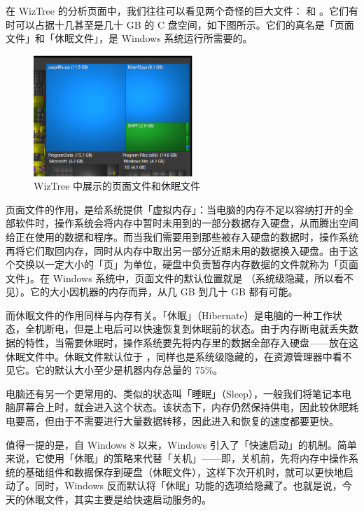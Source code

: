 {在 WizTree 的分析页面中，我们往往可以看见两个奇怪的巨大文件： 和 。它们有时可以占据十几甚至是几十 GB 的 C 盘空间，如下图所示。它们的真名是「页面文件」和「休眠文件」，是 Windows 系统运行所需要的。

\begin{figure}[htb!]
  \centering
  \vspace*{-.2cm}
  \includegraphics[width=6cm]{assets/advanced/Pagefile_and_hiberfil.png}
  \caption{WizTree 中展示的页面文件和休眠文件}
\end{figure}

页面文件的作用，是给系统提供「虚拟内存」：当电脑的内存不足以容纳打开的全部软件时，操作系统会将内存中暂时未用到的一部分数据存入硬盘，从而腾出空间给正在使用的数据和程序。而当我们需要用到那些被存入硬盘的数据时，操作系统再将它们取回内存，同时从内存中取出另一部分近期未用的数据换入硬盘。由于这个交换以一定大小的「页」为单位，硬盘中负责暂存内存数据的文件就称为「页面文件」。在 Windows 系统中，页面文件的默认位置就是  （系统级隐藏，所以看不见）。它的大小因机器的内存而异，从几 GB 到几十 GB 都有可能。

而休眠文件的作用同样与内存有关。「休眠」（Hibernate）是电脑的一种工作状态，全机断电，但是上电后可以快速恢复到休眠前的状态。由于内存断电就丢失数据的特性，当需要休眠时，操作系统要先将内存里的数据全部存入硬盘——放在这休眠文件中。休眠文件默认位于 ，同样也是系统级隐藏的，在资源管理器中看不见它。它的默认大小至少是机器内存总量的 75\%。

\begin{note}
  电脑还有另一个更常用的、类似的状态叫「睡眠」（Sleep），一般我们将笔记本电脑屏幕合上时，就会进入这个状态。该状态下，内存仍然保持供电，因此较休眠耗电要高，但由于不需要进行大量数据转移，因此进入和恢复的速度都要更快。
\end{note}

值得一提的是，自 Windows 8 以来，Windows 引入了「快速启动」的机制。简单来说，它使用「休眠」的策略来代替「关机」——即，关机前，先将内存中操作系统的基础组件和数据保存到硬盘（休眠文件），这样下次开机时，就可以更快地启动了。同时，Windows 反而默认将「休眠」功能的选项给隐藏了。也就是说，今天的休眠文件，其实主要是给快速启动服务的。

}
